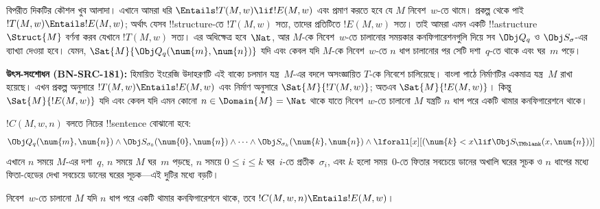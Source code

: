 \documentclass[../../../include/open-logic-section]{subfiles}
\begin{document}
\begin{explain}
বিপরীত দিকটির কৌশল খুব আলাদা। এখানে আমরা ধরি
$\Entails !T(M,w)\lif !E(M,w)$ এবং প্রমাণ করতে হবে যে $M$ নিবেশ~$w$-তে
থামে। প্রকল্প থেকে পাই $!T(M,w)\Entails !E(M,w)$; অর্থাৎ যেসব
!!{structure}-তে $!T(M,w)$ সত্য, তাদের প্রতিটিতে $!E(M,w)$ সত্য। তাই আমরা
এমন একটি !!a{structure}~$\Struct{M}$ বর্ণনা করব যেখানে $!T(M,w)$ সত্য।
এর অধিক্ষেত্র হবে~$\Nat$, আর $M$-কে নিবেশ~$w$-তে চালানোর সময়কার
কনফিগারেশনগুলি দিয়ে সব $\Obj Q_q$ ও $\Obj S_\sigma$-এর ব্যাখ্যা দেওয়া
হবে। যেমন,
$\Sat{M}{\Obj Q_q(\num{m},\num{n})}$ যদি এবং কেবল যদি $M$-কে
নিবেশ~$w$-তে $n$ ধাপ চালানোর পর সেটি দশা~$q$-তে থাকে এবং ঘর~$m$ পড়ে।
\par\smallskip\noindent\textnormal{\small\textbf{উৎস-সংশোধন (BN-SRC-181):} হিমায়িত ইংরেজি উদাহরণটি এই বাক্যে চলমান যন্ত্র~$M$-এর বদলে অসংজ্ঞায়িত $T$-কে নিবেশে চালিয়েছে। বাংলা পাঠে নির্মাণটির একমাত্র যন্ত্র~$M$ রাখা হয়েছে।} %
এখন প্রকল্প অনুসারে $!T(M,w)\Entails !E(M,w)$ এবং নির্মাণ অনুসারে
$\Sat{M}{!T(M,w)}$; অতএব $\Sat{M}{!E(M,w)}$। কিন্তু
$\Sat{M}{!E(M,w)}$ যদি এবং কেবল যদি এমন কোনো
$n\in\Domain{M}=\Nat$ থাকে যাতে নিবেশ~$w$-তে চালানো $M$ যন্ত্রটি
$n$ ধাপ পরে একটি থামার কনফিগারেশনে থাকে।
\end{explain}

\begin{defn}
$!C(M,w,n)$ বলতে নিচের !!{sentence} বোঝানো হবে:
\[
\Obj Q_q(\num{m}, \num{n}) \land \Obj S_{\sigma_0}(\num{0}, \num{n})
\land \dots \land \Obj S_{\sigma_k}(\num{k}, \num{n}) \land
\lforall[x][(\num{k} < x \lif \Obj S_\TMblank(x, \num{n}))]
\]
এখানে $n$ সময়ে $M$-এর দশা~$q$, $n$ সময়ে $M$ ঘর~$m$ পড়ছে, $n$ সময়ে
$0\le i\le k$ ঘর~$i$-তে প্রতীক~$\sigma_i$, এবং $k$ হলো সময়~$0$-তে
ফিতার সবচেয়ে ডানের অখালি ঘরের সূচক ও $n$ ধাপের মধ্যে ফিতা-হেডের দেখা
সবচেয়ে ডানের ঘরের সূচক—এই দুটির মধ্যে বড়টি।
\end{defn}

\begin{lem}
নিবেশ~$w$-তে চালানো $M$ যদি $n$ ধাপ পরে একটি থামার কনফিগারেশনে থাকে,
তবে $!C(M,w,n)\Entails !E(M,w)$।
\end{lem}
\end{document}
